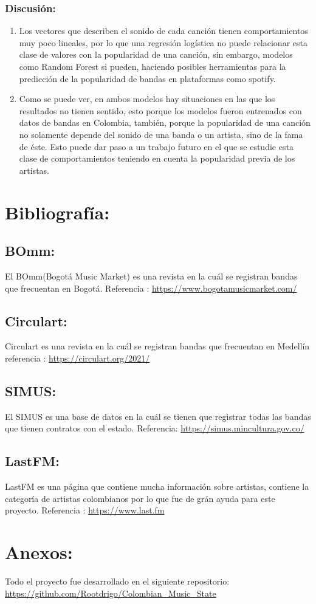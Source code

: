 \documentclass[11pt]{article}
\begin{document}
\subsubsection{Discusión:}
\label{sec:orge3befb2}
\begin{enumerate}
\item Los vectores que describen el sonido de cada canción tienen comportamientos muy poco lineales, por lo que una regresión logística no puede relacionar esta clase de valores con la popularidad de una canción, sin embargo, modelos como Random Forest si pueden, haciendo posibles herramientas para la predicción de la popularidad de bandas en plataformas como spotify.
\item Como se puede ver, en ambos modelos hay situaciones en las que los resultados no tienen sentido, esto porque los modelos fueron entrenados con datos de bandas en Colombia, también, porque la popularidad de una canción no solamente depende del sonido de una banda o un artista, sino de la fama de éste. Esto puede dar paso a un trabajo futuro en el que se estudie esta clase de comportamientos teniendo en cuenta la popularidad previa de los artistas.
\end{enumerate}




\section{Bibliografía:}
\label{sec:org1811e79}
\subsection{BOmm:}
\label{sec:org50b6d07}
El BOmm(Bogotá Music Market) es una revista en la cuál se registran bandas que
frecuentan en Bogotá.
Referencia : \url{https://www.bogotamusicmarket.com/}
\subsection{Circulart:}
\label{sec:org737c890}
Circulart es una revista en la cuál se registran bandas que frecuentan en
Medellín referencia :  \url{https://circulart.org/2021/}
\subsection{SIMUS:}
\label{sec:org48d4fec}
El SIMUS es una base de datos en la cuál se tienen que registrar todas las
bandas que tienen contratos con el estado.
Referencia: \url{https://simus.mincultura.gov.co/}
\subsection{LastFM:}
\label{sec:orgbeb98ea}
LastFM es una página que contiene mucha información sobre artistas, contiene la
categoría de artistas colombianos por lo que fue de grán ayuda para este
proyecto.
Referencia : \url{https://www.last.fm}

\section{Anexos:}
\label{sec:org90ce74f}

Todo el proyecto fue desarrollado en el siguiente repositorio:
\url{https://github.com/Rootdrigo/Colombian\_Music\_State}
\end{document}
